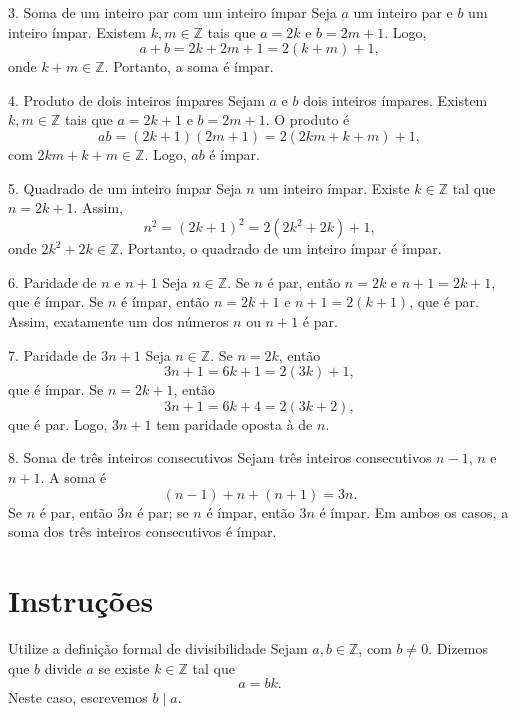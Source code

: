 \documentclass[12pt,a4paper,openright]{book}
\begin{document}
\begin{block}{3. Soma de um inteiro par com um inteiro ímpar}
Seja $a$ um inteiro par e $b$ um inteiro ímpar. Existem $k,m \in \mathbb{Z}$ tais que
$a = 2k$ e $b = 2m+1$. Logo,
\[
a+b = 2k + 2m + 1 = 2(k+m)+1,
\]
onde $k+m \in \mathbb{Z}$. Portanto, a soma é ímpar.
\end{block}

\begin{block}{4. Produto de dois inteiros ímpares}
Sejam $a$ e $b$ dois inteiros ímpares. Existem $k,m \in \mathbb{Z}$ tais que
$a = 2k+1$ e $b = 2m+1$. O produto é
\[
ab = (2k+1)(2m+1) = 2(2km+k+m)+1,
\]
com $2km+k+m \in \mathbb{Z}$. Logo, $ab$ é ímpar.
\end{block}

\begin{block}{5. Quadrado de um inteiro ímpar}
Seja $n$ um inteiro ímpar. Existe $k \in \mathbb{Z}$ tal que $n = 2k+1$. Assim,
\[
n^2 = (2k+1)^2 = 2(2k^2+2k)+1,
\]
onde $2k^2+2k \in \mathbb{Z}$. Portanto, o quadrado de um inteiro ímpar é ímpar.
\end{block}

\begin{block}{6. Paridade de $n$ e $n+1$}
Seja $n \in \mathbb{Z}$. Se $n$ é par, então $n=2k$ e $n+1=2k+1$, que é ímpar.
Se $n$ é ímpar, então $n=2k+1$ e $n+1=2(k+1)$, que é par.
Assim, exatamente um dos números $n$ ou $n+1$ é par.
\end{block}

\begin{block}{7. Paridade de $3n+1$}
Seja $n \in \mathbb{Z}$. Se $n=2k$, então
\[
3n+1 = 6k+1 = 2(3k)+1,
\]
que é ímpar. Se $n=2k+1$, então
\[
3n+1 = 6k+4 = 2(3k+2),
\]
que é par. Logo, $3n+1$ tem paridade oposta à de $n$.
\end{block}

\begin{block}{8. Soma de três inteiros consecutivos}
Sejam três inteiros consecutivos $n-1$, $n$ e $n+1$. A soma é
\[
(n-1)+n+(n+1)=3n.
\]
Se $n$ é par, então $3n$ é par; se $n$ é ímpar, então $3n$ é ímpar.
Em ambos os casos, a soma dos três inteiros consecutivos é ímpar.
\end{block}
\section*{Instruções}

\begin{block}{Utilize a definição formal de divisibilidade}
Sejam $a,b \in \mathbb{Z}$, com $b \neq 0$. Dizemos que $b$ divide $a$ se existe
$k \in \mathbb{Z}$ tal que
\[
a = bk.
\]
Neste caso, escrevemos $b \mid a$.
\end{block}
\end{document}
